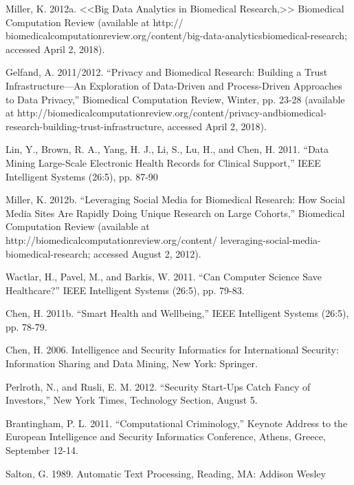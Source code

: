 


	Miller, K. 2012a. <<Big Data Analytics in Biomedical Research,>>
	Biomedical Computation Review (available at http://
	biomedicalcomputationreview.org/content/big-data-analyticsbiomedical-research;
	accessed April 2, 2018).

	Gelfand, A. 2011/2012. “Privacy and Biomedical Research:
	Building a Trust Infrastructure—An Exploration of Data-Driven
	and Process-Driven Approaches to Data Privacy,” Biomedical
	Computation Review, Winter, pp. 23-28 (available at http://biomedicalcomputationreview.org/content/privacy-andbiomedical-research-building-trust-infrastructure,
	accessed
	April 2, 2018).
	
	Lin, Y., Brown, R. A., Yang, H. J., Li, S., Lu, H., and Chen, H.
	2011. “Data Mining Large-Scale Electronic Health Records for
	Clinical Support,” IEEE Intelligent Systems (26:5), pp. 87-90
	
	Miller, K. 2012b. “Leveraging Social Media for Biomedical
	Research: How Social Media Sites Are Rapidly Doing Unique
	Research on Large Cohorts,” Biomedical Computation Review
	(available at http://biomedicalcomputationreview.org/content/
	leveraging-social-media-biomedical-research; accessed August
	2, 2012).

	Wactlar, H., Pavel, M., and Barkis, W. 2011. “Can Computer
	Science Save Healthcare?” IEEE Intelligent Systems (26:5), pp.
	79-83.
	
	Chen, H. 2011b. “Smart Health and Wellbeing,” IEEE Intelligent
	Systems (26:5), pp. 78-79.

	Chen, H. 2006. Intelligence and Security Informatics for International
	Security: Information Sharing and Data Mining, New
	York: Springer.

	Perlroth, N., and Rusli, E. M. 2012. “Security Start-Ups Catch
	Fancy of Investors,” New York Times, Technology Section,
	August 5.

	Brantingham, P. L. 2011. “Computational Criminology,” Keynote
	Address to the European Intelligence and Security Informatics
	Conference, Athens, Greece, September 12-14.
	
	Salton, G. 1989. Automatic Text Processing, Reading, MA:
	Addison Wesley


